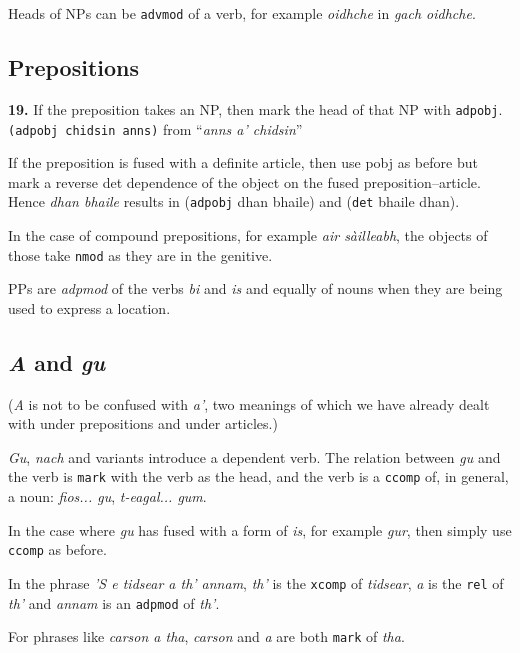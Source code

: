 \documentclass[a4paper]{article}
\begin{document}
 Heads of NPs can be \texttt{advmod} of a verb, for example \textit{oidhche} in \textit{gach oidhche}.

\subsection{Prepositions}

{\bf 19.} If the preposition takes an NP, then mark the head of that NP with \texttt{adpobj}. \texttt{(adpobj chidsin anns)} from ``\textit{anns a' chidsin}''

 If the preposition is fused with a definite article, then use pobj as before but mark a reverse det dependence of the object on the fused preposition--article. Hence \textit{dhan bhaile} results in (\texttt{adpobj} dhan bhaile) and (\texttt{det} bhaile dhan).

 In the case of compound prepositions, for example \textit{air s\`ailleabh}, the objects of those take \texttt{nmod} as they are in the genitive.

 PPs are \textit{adpmod} of the verbs \textit{bi} and \textit{is} and equally of nouns when they are being used to express a location.

\subsection{\textit{A} and \textit{gu}}

(\textit{A} is not to be confused with \textit{a'}, two meanings of which we have already dealt with under prepositions and under articles.)

 \textit{Gu}, \textit{nach} and variants introduce a dependent verb. The relation between \textit{gu} and the verb is \texttt{mark} with the verb as the head, and the verb is a \texttt{ccomp} of, in general, a noun: \textit{fios... gu}, \textit{t-eagal... gum}.

 In the case where \textit{gu} has fused with a form of \textit{is}, for example \textit{gur}, then simply use \texttt{ccomp} as before.

 In the phrase \textit{'S e tidsear a th' annam}, \textit{th'} is the \texttt{xcomp} of \textit{tidsear}, \textit{a} is the \texttt{rel} of \textit{th'} and \textit{annam} is an \texttt{adpmod} of \textit{th'}.

 For phrases like \textit{carson a tha}, \textit{carson} and \textit{a} are both \texttt{mark} of \textit{tha}.
\end{document}
